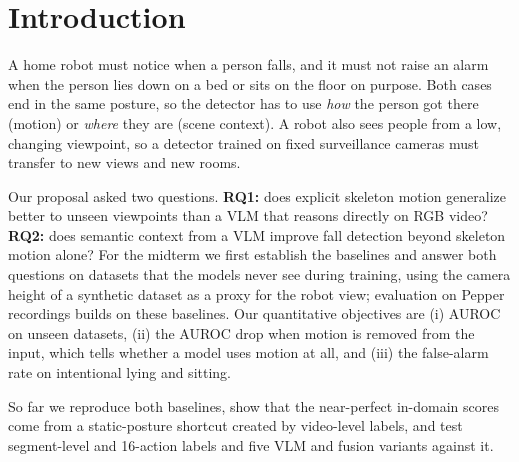 
\maketitle

\begin{abstract}
We build a fall detector for the Pepper robot that fuses ST-GCN skeleton motion with a frozen Qwen2.5-VL.
All models we train on FallVision reach a video AUROC of 0.99, but a classifier on a \emph{single} skeleton frame already reaches 0.942: the models detect a lying posture, not a fall.
Adding synthetic data raises AUROC on unseen datasets (GMDCSA24 0.932$\to$0.968), and segment-level fall labels make ST-GCN rely on motion.
No single modality is reliable on every unseen dataset; fusing both and training on 16 fall-related actions gives the most consistent model (mean unseen AUROC 0.911), although the fusion still uses skeleton motion only weakly.
\end{abstract}

\section{Introduction}

A home robot must notice when a person falls, and it must not raise an alarm when the person lies down on a bed or sits on the floor on purpose.
Both cases end in the same posture, so the detector has to use \emph{how} the person got there (motion) or \emph{where} they are (scene context).
A robot also sees people from a low, changing viewpoint, so a detector trained on fixed surveillance cameras must transfer to new views and new rooms.

Our proposal asked two questions.
\textbf{RQ1:} does explicit skeleton motion generalize better to unseen viewpoints than a VLM that reasons directly on RGB video?
\textbf{RQ2:} does semantic context from a VLM improve fall detection beyond skeleton motion alone?
For the midterm we first establish the baselines and answer both questions on datasets that the models never see during training, using the camera height of a synthetic dataset as a proxy for the robot view; evaluation on Pepper recordings builds on these baselines.
Our quantitative objectives are (i) AUROC on unseen datasets, (ii) the AUROC drop when motion is removed from the input, which tells whether a model uses motion at all, and (iii) the false-alarm rate on intentional lying and sitting.

So far we reproduce both baselines, show that the near-perfect in-domain scores come from a static-posture shortcut created by video-level labels, and test segment-level and 16-action labels and five VLM and fusion variants against it.

